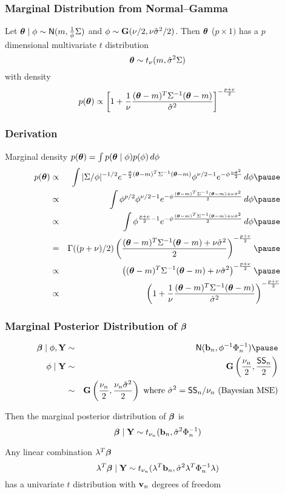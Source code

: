 \documentclass[handout]{beamer}\usepackage[]{graphicx}\usepackage[]{color}
\begin{document}
\begin{frame}
  \frametitle{Marginal Distribution from Normal--Gamma }
  \begin{theorem}
    Let  $\boldsymbol{\theta} \mid \phi \sim \textsf{N}(m, \frac{1}{\phi} \Sigma)$ and $\phi \sim
    \mathbf{G}(\nu/2, \nu {\hat{\sigma}}^2/2)$. Then  $\boldsymbol{\theta}$ ($p \times 1)$ has a $p$
    dimensional multivariate $t$ distribution $$\boldsymbol{\theta} \sim t_\nu( m,
    {\hat{\sigma}}^2 \Sigma )$$ with density
$$p(\boldsymbol{\theta}) \propto  \left[ 1 + \frac{1}{\nu}  \frac{ (\boldsymbol{\theta} - m)^T
    \Sigma^{-1} (\boldsymbol{\theta} - m)}{{\hat{\sigma}}^2} \right]^{- \frac{p + \nu}{2}}$$
  \end{theorem}
\end{frame}
\begin{frame}
  \frametitle{Derivation}
Marginal density  $p(\boldsymbol{\theta}) = \int p(\boldsymbol{\theta} \mid \phi) p(\phi) \, d\phi$
\pause
\begin{eqnarray*}
  p(\t) & \propto & \int |\Sigma/\phi|^{-1/2}
e^{- \frac{\phi}{2} (\t - m)^T
    \Sigma^{-1} (\t - m)}  \phi^{\nu/2 - 1} e^{- \phi \frac{\nu
      \shat}{2}}\, d \phi \pause \\
  & \propto & \int \phi^{p/2} \phi^{\nu/2 - 1}
e^{- \phi \frac{(\t - m)^T
    \Sigma^{-1} (\t - m)+  \nu
      \shat}{2}}\, d \phi \pause \\
 & \propto & \int \phi^{\frac{p +\nu}{2} - 1}
e^{- \phi \frac{(\t - m)^T
    \Sigma^{-1} (\t - m)+  \nu
      \shat}{2}} \, d \phi \pause \\
& = & \Gamma((p + \nu)/2 ) \left( \frac{(\t - m)^T
    \Sigma^{-1} (\t - m)+  \nu
      \shat}{2} \right)^{- \frac{p + \nu}{2}} \pause \\
& \propto &  \left( (\t - m)^T
    \Sigma^{-1} (\t - m)+  \nu
      \shat \right)^{- \frac{p + \nu}{2}} \pause \\
& \propto &  \left( 1 + \frac{1}{\nu}  \frac{(\t - m)^T
    \Sigma^{-1} (\t - m)}{\shat}
       \right)^{- \frac{p + \nu}{2}}
\end{eqnarray*}
\end{frame}
\begin{frame}
  \frametitle{Marginal Posterior Distribution of $\boldsymbol{\beta}$}
  \begin{eqnarray*}
\b \mid \phi, \Y  & \sim & \N( \bv_n, \phi^{-1} \Phi_n^{-1}) \pause \\
 \phi \mid \Y & \sim & \G\left(\frac{\nu_n}{2},  \frac{\SS_n}{ 2} \right) \\
    & \sim & \G\left(\frac{\nu_n}{2},  \frac{\nu_n \shat}{ 2} \right)
    \text{ where } \shat = \SS_n/\nu_n  \text{ (Bayesian MSE)}
  \end{eqnarray*}
\pause


Then the marginal posterior distribution of $\boldsymbol{\beta}$ is
$$
\boldsymbol{\beta}  \mid \mathbf{Y} \sim t_{\nu_n} (\mathbf{b}_n, {\hat{\sigma}}^2 \Phi_n^{-1})
$$ \pause


Any linear combination $\lambda^T\boldsymbol{\beta}$
$$\lambda^T\boldsymbol{\beta}  \mid \mathbf{Y} \sim t_{\nu_n}
(\lambda^T\mathbf{b}_n, {\hat{\sigma}}^2 \lambda^T\Phi_n^{-1}\lambda)$$ has a univariate
$t$ distribution with $\mathbf{v}_n$ degrees of freedom

\end{frame}
\end{document}
